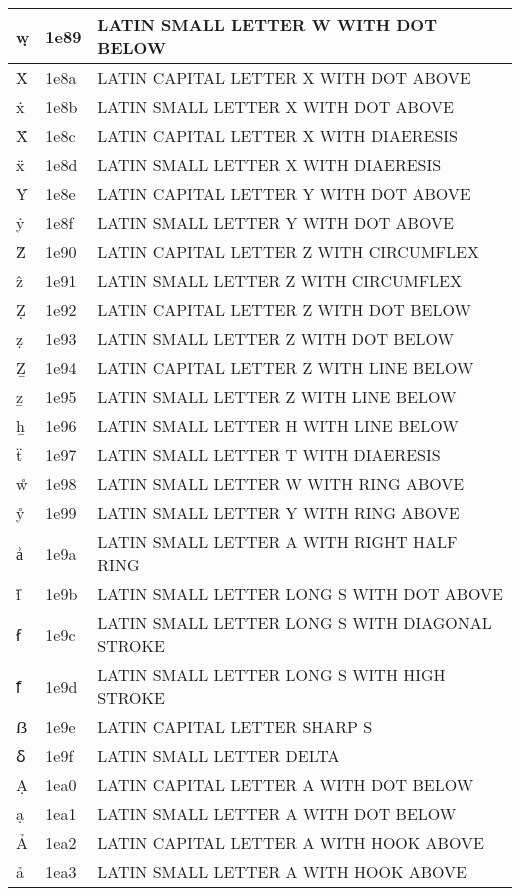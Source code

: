 \documentclass[12pt,letterpaper,openany]{book}
\begin{document}
\begin{center}
\begin{supertabular}{|m{0.25in}|m{0.5in}|m{4in}|}
ẉ & 1e89 & LATIN SMALL LETTER W WITH DOT BELOW\\\hline
Ẋ & 1e8a & LATIN CAPITAL LETTER X WITH DOT ABOVE\\\hline
ẋ & 1e8b & LATIN SMALL LETTER X WITH DOT ABOVE\\\hline
Ẍ & 1e8c & LATIN CAPITAL LETTER X WITH DIAERESIS\\\hline
ẍ & 1e8d & LATIN SMALL LETTER X WITH DIAERESIS\\\hline
Ẏ & 1e8e & LATIN CAPITAL LETTER Y WITH DOT ABOVE\\\hline
ẏ & 1e8f & LATIN SMALL LETTER Y WITH DOT ABOVE\\\hline
Ẑ & 1e90 & LATIN CAPITAL LETTER Z WITH CIRCUMFLEX\\\hline
ẑ & 1e91 & LATIN SMALL LETTER Z WITH CIRCUMFLEX\\\hline
Ẓ & 1e92 & LATIN CAPITAL LETTER Z WITH DOT BELOW\\\hline
ẓ & 1e93 & LATIN SMALL LETTER Z WITH DOT BELOW\\\hline
Ẕ & 1e94 & LATIN CAPITAL LETTER Z WITH LINE BELOW\\\hline
ẕ & 1e95 & LATIN SMALL LETTER Z WITH LINE BELOW\\\hline
ẖ & 1e96 & LATIN SMALL LETTER H WITH LINE BELOW\\\hline
ẗ & 1e97 & LATIN SMALL LETTER T WITH DIAERESIS\\\hline
ẘ & 1e98 & LATIN SMALL LETTER W WITH RING ABOVE\\\hline
ẙ & 1e99 & LATIN SMALL LETTER Y WITH RING ABOVE\\\hline
ẚ & 1e9a & LATIN SMALL LETTER A WITH RIGHT HALF RING\\\hline
ẛ & 1e9b & LATIN SMALL LETTER LONG S WITH DOT ABOVE\\\hline
ẜ & 1e9c & LATIN SMALL LETTER LONG S WITH DIAGONAL STROKE\\\hline
ẝ & 1e9d & LATIN SMALL LETTER LONG S WITH HIGH STROKE\\\hline
ẞ & 1e9e & LATIN CAPITAL LETTER SHARP S\\\hline
ẟ & 1e9f & LATIN SMALL LETTER DELTA\\\hline
Ạ & 1ea0 & LATIN CAPITAL LETTER A WITH DOT BELOW\\\hline
ạ & 1ea1 & LATIN SMALL LETTER A WITH DOT BELOW\\\hline
Ả & 1ea2 & LATIN CAPITAL LETTER A WITH HOOK ABOVE\\\hline
ả & 1ea3 & LATIN SMALL LETTER A WITH HOOK ABOVE\\\hline

\end{supertabular}
\end{center}
\end{document}
